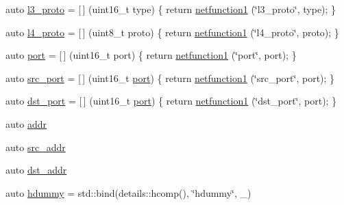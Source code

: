 \begin{DoxyCompactItemize}
\item 
auto \hyperlink{namespacepfq__lang_1_1anonymous__namespace_02default_8hpp_03_aed01dd5380a873d92397ec0d4c07abac}{l3\+\_\+proto} = \mbox{[}$\,$\mbox{]} (uint16\+\_\+t type) \{ return \hyperlink{namespacepfq__lang_af215f25fa7ebd61fdc90cf0ef78a3164}{netfunction1} (\char`\"{}l3\+\_\+proto\char`\"{}, type); \}
\item 
auto \hyperlink{namespacepfq__lang_1_1anonymous__namespace_02default_8hpp_03_a75da77904f1cff4cc42fc3a081f80670}{l4\+\_\+proto} = \mbox{[}$\,$\mbox{]} (uint8\+\_\+t proto) \{ return \hyperlink{namespacepfq__lang_af215f25fa7ebd61fdc90cf0ef78a3164}{netfunction1} (\char`\"{}l4\+\_\+proto\char`\"{}, proto); \}
\item 
auto \hyperlink{namespacepfq__lang_1_1anonymous__namespace_02default_8hpp_03_a1b370b44e5eedc364f3bb306d5042738}{port} = \mbox{[}$\,$\mbox{]} (uint16\+\_\+t port) \{ return \hyperlink{namespacepfq__lang_af215f25fa7ebd61fdc90cf0ef78a3164}{netfunction1} (\char`\"{}port\char`\"{}, port); \}
\item 
auto \hyperlink{namespacepfq__lang_1_1anonymous__namespace_02default_8hpp_03_ad4d03d1e69ba9608a2d87ac91a2b521f}{src\+\_\+port} = \mbox{[}$\,$\mbox{]} (uint16\+\_\+t \hyperlink{namespacepfq__lang_1_1anonymous__namespace_02default_8hpp_03_a1b370b44e5eedc364f3bb306d5042738}{port}) \{ return \hyperlink{namespacepfq__lang_af215f25fa7ebd61fdc90cf0ef78a3164}{netfunction1} (\char`\"{}src\+\_\+port\char`\"{}, port); \}
\item 
auto \hyperlink{namespacepfq__lang_1_1anonymous__namespace_02default_8hpp_03_aceccbe6ec912638fb8d5d3d9e0372a09}{dst\+\_\+port} = \mbox{[}$\,$\mbox{]} (uint16\+\_\+t \hyperlink{namespacepfq__lang_1_1anonymous__namespace_02default_8hpp_03_a1b370b44e5eedc364f3bb306d5042738}{port}) \{ return \hyperlink{namespacepfq__lang_af215f25fa7ebd61fdc90cf0ef78a3164}{netfunction1} (\char`\"{}dst\+\_\+port\char`\"{}, port); \}
\item 
auto \hyperlink{namespacepfq__lang_1_1anonymous__namespace_02default_8hpp_03_aafce8334d1be83bff9a2115439c8c453}{addr}
\item 
auto \hyperlink{namespacepfq__lang_1_1anonymous__namespace_02default_8hpp_03_a63c87ff605d7cefa807fd61bc463785d}{src\+\_\+addr}
\item 
auto \hyperlink{namespacepfq__lang_1_1anonymous__namespace_02default_8hpp_03_a4b72bac7c3af312ffe7c670eb2583f9a}{dst\+\_\+addr}
\item 
auto \hyperlink{namespacepfq__lang_1_1anonymous__namespace_02default_8hpp_03_a4e7cf4874b42c5722f420fc54f360242}{hdummy} = std\+::bind(details\+::hcomp(), \char`\"{}hdummy\char`\"{}, \+\_)

\end{DoxyCompactItemize}
